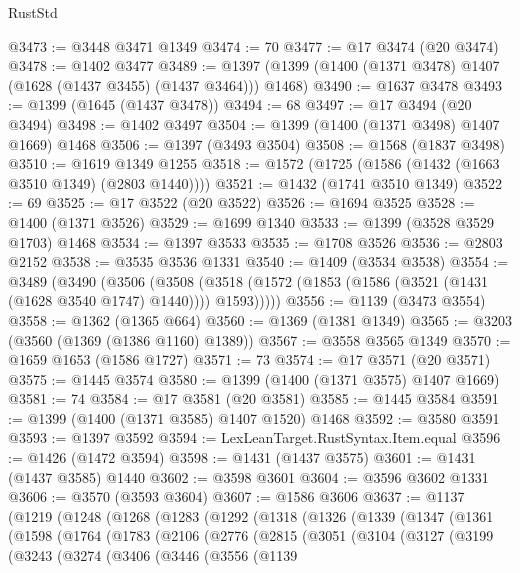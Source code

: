 \begin{lexlean}{RustStd}
\begin{coremodule}
@3473 := @3448 @3471 @1349
@3474 := 70
@3477 := @17 @3474 (@20 @3474)
@3478 := @1402 @3477
@3489 := @1397 (@1399 (@1400 (@1371 @3478) @1407 (@1628 (@1437 @3455) (@1437 @3464))) @1468)
@3490 := @1637 @3478
@3493 := @1399 (@1645 (@1437 @3478))
@3494 := 68
@3497 := @17 @3494 (@20 @3494)
@3498 := @1402 @3497
@3504 := @1399 (@1400 (@1371 @3498) @1407 @1669) @1468
@3506 := @1397 (@3493 @3504)
@3508 := @1568 (@1837 @3498)
@3510 := @1619 @1349 @1255
@3518 := @1572 (@1725 (@1586 (@1432 (@1663 @3510 @1349) (@2803 @1440))))
@3521 := @1432 (@1741 @3510 @1349)
@3522 := 69
@3525 := @17 @3522 (@20 @3522)
@3526 := @1694 @3525
@3528 := @1400 (@1371 @3526)
@3529 := @1699 @1340
@3533 := @1399 (@3528 @3529 @1703) @1468
@3534 := @1397 @3533
@3535 := @1708 @3526
@3536 := @2803 @2152
@3538 := @3535 @3536 @1331
@3540 := @1409 (@3534 @3538)
@3554 := @3489
    (@3490
      (@3506
        (@3508 (@3518 (@1572 (@1853 (@1586 (@3521 (@1431 (@1628 @3540 @1747) @1440)))) @1593)))))
@3556 := @1139 (@3473 @3554)
@3558 := @1362 (@1365 @664)
@3560 := @1369 (@1381 @1349)
@3565 := @3203 (@3560 (@1369 (@1386 @1160) @1389))
@3567 := @3558 @3565 @1349
@3570 := @1659 @1653 (@1586 @1727)
@3571 := 73
@3574 := @17 @3571 (@20 @3571)
@3575 := @1445 @3574
@3580 := @1399 (@1400 (@1371 @3575) @1407 @1669)
@3581 := 74
@3584 := @17 @3581 (@20 @3581)
@3585 := @1445 @3584
@3591 := @1399 (@1400 (@1371 @3585) @1407 @1520) @1468
@3592 := @3580 @3591
@3593 := @1397 @3592
@3594 := LexLeanTarget.RustSyntax.Item.equal
@3596 := @1426 (@1472 @3594)
@3598 := @1431 (@1437 @3575)
@3601 := @1431 (@1437 @3585) @1440
@3602 := @3598 @3601
@3604 := @3596 @3602 @1331
@3606 := @3570 (@3593 @3604)
@3607 := @1586 @3606
@3637 := @1137
    (@1219
      (@1248
        (@1268
          (@1283
            (@1292
              (@1318
                (@1326
                  (@1339
                    (@1347
                      (@1361
                        (@1598
                          (@1764
                            (@1783
                              (@2106
                                (@2776
                                  (@2815
                                    (@3051
                                      (@3104
                                        (@3127
                                          (@3199
                                            (@3243
                                              (@3274
                                                (@3406
                                                  (@3446
                                                    (@3556
                                                      (@1139

\end{coremodule}
\end{lexlean}
